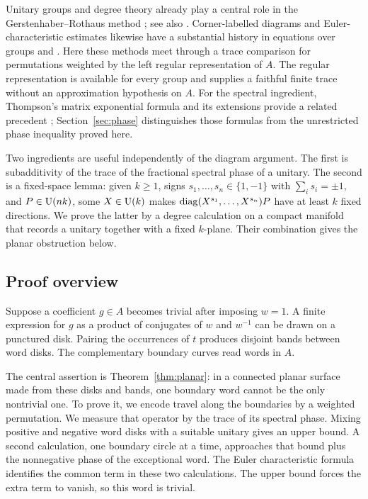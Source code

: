 Unitary groups and degree theory already play a central role in the
Gerstenhaber--Rothaus method \cite[Theorem 1]{GerstenhaberRothaus1962}; see also
\cite[Section 1.1]{KlyachkoThom2017}.
Corner-labelled diagrams and Euler-characteristic estimates likewise
have a substantial history in equations over groups
\cite[preprint Sections 3--4]{KlyachkoLurye2012}
and \cite[preprint Sections 2--4]{Chen2026}.
Here these methods meet through a trace comparison for permutations
weighted by the left regular representation of $A$. The regular
representation is available for every group and supplies a faithful
finite trace without an approximation hypothesis on $A$.
For the spectral ingredient, Thompson's matrix exponential formula and
its extensions provide a related precedent
\cite[Section 2 and Theorem 4.4]{AntezanaLarotondaVarela2012};
Section~\ref{sec:phase} distinguishes those formulas from the unrestricted
phase inequality proved here.

Two ingredients are useful independently of the diagram argument.
The first is subadditivity of the trace of the fractional spectral phase
of a unitary. The second is a fixed-space lemma: given $k\geq1$, signs
$s_1,\ldots,s_n\in\{1,-1\}$ with $\sum_i s_i=\pm1$, and $P\in\operatorname{U}(nk)$,
some $X\in\operatorname{U}(k)$ makes $\operatorname{diag}(X^{s_1},\ldots,X^{s_n})P$
have at least $k$ fixed directions. We prove the latter by a degree
calculation on a compact manifold that records a unitary together with
a fixed $k$-plane. Their combination gives the planar obstruction below.

\subsection{Proof overview}

Suppose a coefficient $g\in A$ becomes trivial after imposing $w=1$.
A finite expression for $g$ as a product of conjugates of $w$ and $w^{-1}$
can be drawn on a punctured disk. Pairing the occurrences of $t$ produces
disjoint bands between word disks. The complementary boundary curves
read words in $A$.

The central assertion is Theorem~\ref{thm:planar}: in a connected planar
surface made from these disks and bands, one boundary word cannot be the
only nontrivial one. To prove it, we encode travel along the boundaries
by a weighted permutation. We measure that operator by the trace of its
spectral phase. Mixing positive and negative word disks with a suitable
unitary gives an upper bound. A second calculation, one boundary circle
at a time, approaches that bound plus the nonnegative phase of the
exceptional word. The Euler characteristic formula identifies the common
term in these two calculations. The upper bound forces the extra term to
vanish, so this word is trivial.

